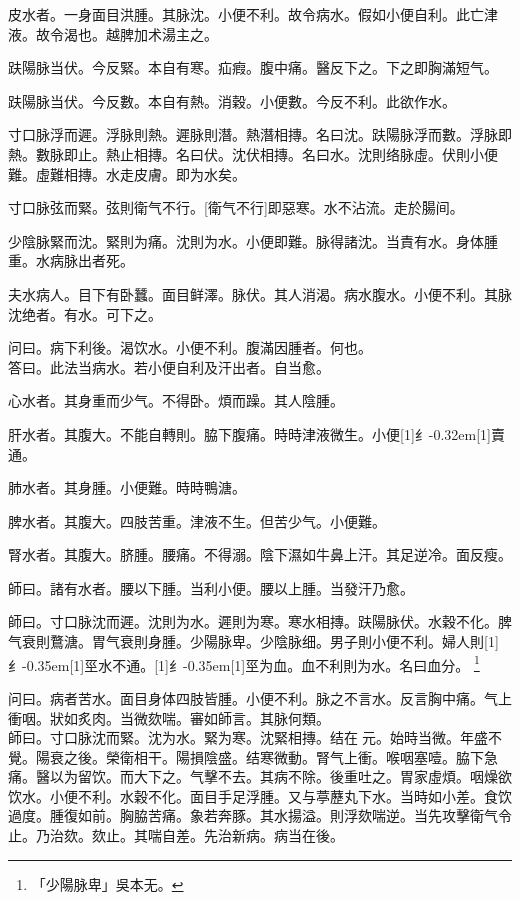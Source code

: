 \documentclass[oneside,b4paper]{ctexbook}
\begin{document}
\begin{flushleft}
皮水者。一身面目洪腫。其脉沈。小便不利。故令病水。假如小便自利。此亡津液。故令渴也。越脾加术湯主之。

趺陽脉当伏。今反緊。本自有寒。疝瘕。腹中痛。醫反下之。下之即胸滿短气。

趺陽脉当伏。今反數。本自有熱。消穀。小便數。今反不利。此欲作水。

寸口脉浮而遲。浮脉則熱。遲脉則潛。熱潛相摶。名曰沈。趺陽脉浮而數。浮脉即熱。數脉即止。熱止相摶。名曰伏。沈伏相摶。名曰水。沈則络脉虛。伏則小便難。虛難相摶。水走皮膚。即为水矣。

寸口脉弦而緊。弦則衛气不行。[衛气不行]即惡寒。水不沾流。走於腸间。

少陰脉緊而沈。緊則为痛。沈則为水。小便即難。脉得諸沈。当責有水。身体腫重。水病脉出者死。

夫水病人。目下有卧蠶。面目鲜澤。脉伏。其人消渴。病水腹水。小便不利。其脉沈绝者。有水。可下之。

问曰。病下利後。渴饮水。小便不利。腹滿因腫者。何也。\\
答曰。此法当病水。若小便自利及汗出者。自当愈。

心水者。其身重而少气。不得卧。煩而躁。其人陰腫。

肝水者。其腹大。不能自轉則。脇下腹痛。時時津液微生。小便{\hbox{\scalebox{0.6}[1]{纟}\kern-0.32em\scalebox{0.7}[1]{賣}}}通。

肺水者。其身腫。小便難。時時鴨溏。

脾水者。其腹大。四肢苦重。津液不生。但苦少气。小便難。

腎水者。其腹大。脐腫。腰痛。不得溺。陰下濕如牛鼻上汗。其足逆冷。面反瘦。

師曰。諸有水者。腰以下腫。当利小便。腰以上腫。当發汗乃愈。

師曰。寸口脉沈而遲。沈則为水。遲則为寒。寒水相摶。趺陽脉伏。水穀不化。脾气衰則鶩溏。胃气衰則身腫。少陽脉卑。少陰脉细。男子則小便不利。婦人則{\hbox{\scalebox{0.68}[1]{纟}\kern-0.35em\scalebox{0.64}[1]{巠}}}水不通。{\hbox{\scalebox{0.68}[1]{纟}\kern-0.35em\scalebox{0.64}[1]{巠}}}为血。血不利則为水。名曰血分。
\footnote{「少陽脉卑」吳本无。}

问曰。病者苦水。面目身体四肢皆腫。小便不利。脉之不言水。反言胸中痛。气上衝咽。狀如炙肉。当微欬喘。審如師言。其脉何類。\\
師曰。寸口脉沈而緊。沈为水。緊为寒。沈緊相摶。结在{𬮦}元。始時当微。年盛不覺。陽衰之後。榮衛相干。陽損陰盛。结寒微動。腎气上衝。喉咽塞噎。脇下急痛。醫以为留饮。而大下之。气擊不去。其病不除。後重吐之。胃家虛煩。咽燥欲饮水。小便不利。水穀不化。面目手足浮腫。又与葶藶丸下水。当時如小差。食饮過度。腫復如前。胸脇苦痛。象若奔豚。其水揚溢。則浮欬喘逆。当先攻擊衛气令止。乃治欬。欬止。其喘自差。先治新病。病当在後。


\end{flushleft}
\end{document}

